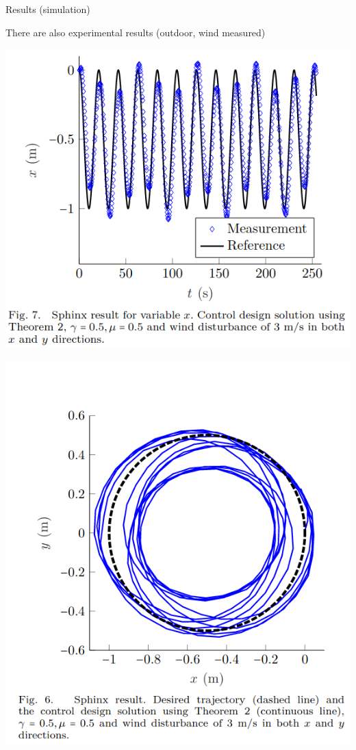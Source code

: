 \begin{frame}{Results (simulation)}
\begin{block}{}
There are also experimental results (outdoor, wind measured)
\end{block}
\begin{minipage}{0.45\textwidth}
        \centering
        \includegraphics[scale=0.3]{img/icuas_x_teo2.png}
    \end{minipage}\hfill
    \begin{minipage}{0.45\textwidth}
        \centering
        \includegraphics[scale=0.25]{img/icuas_xy_teo2.png}

\end{minipage}
\end{frame}
